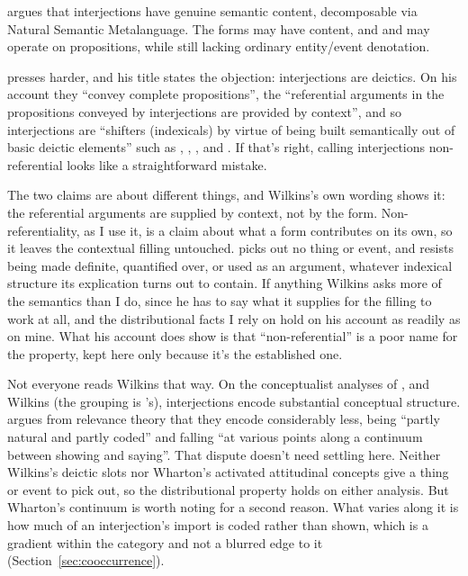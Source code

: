 \documentclass[12pt]{article}
\begin{document}
\textcite[159]{wierzbicka1992} argues that interjections have genuine
semantic content, decomposable via Natural Semantic Metalanguage. The
forms may have content, and  and  may operate
on propositions, while still lacking ordinary entity/event denotation.

\textcite[119]{wilkins1992} presses harder, and his title states the
objection: interjections are deictics. On his account they \enquote{convey
complete propositions}, the \enquote{referential arguments in the
propositions conveyed by interjections are provided by context}, and so
interjections are \enquote{shifters (indexicals) by virtue of
being built semantically out of basic deictic elements} such as
, , , and . If that's
right, calling interjections non-referential looks like a straightforward
mistake.

The two claims are about different things, and Wilkins's own wording shows
it: the referential arguments are supplied by context, not by the form.
Non-referentiality, as I use it, is a claim about what a form contributes on
its own, so it leaves the contextual filling untouched.  picks
out no thing or event, and resists being made definite, quantified over, or
used as an argument, whatever indexical structure its explication turns out to
contain. If anything Wilkins asks more of the semantics than I do, since he has
to say what it supplies for the filling to work at all, and the distributional
facts I rely on hold on his account as readily as on mine. What his account does show is that
\enquote{non-referential} is a poor name for the property, kept here only
because it's the established one.

Not everyone reads Wilkins that way. On the conceptualist analyses of
\textcite{wierzbicka1992}, \textcite{ameka1992} and Wilkins (the grouping is
\citealp[174]{wharton2000}'s), interjections encode substantial conceptual
structure. \textcite[211]{wharton2000} argues
from relevance theory that they encode considerably less, being
\enquote{partly natural and partly coded} and falling \enquote{at various
points along a continuum between showing and saying}. That
dispute doesn't need settling here. Neither Wilkins's deictic slots nor
Wharton's activated attitudinal concepts give  a thing or event
to pick out, so the distributional property holds on either analysis. But
Wharton's continuum is worth noting for a second reason. What varies along it
is how much of an interjection's import is coded rather than shown, which is a
gradient within the category and not a blurred edge to it
(Section~\ref{sec:cooccurrence}).
\end{document}
